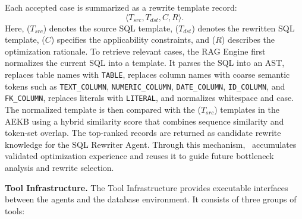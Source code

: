 % 
Each accepted case is summarized as a rewrite template record:
\[
\langle T_{\mathit{src}}, T_{\mathit{dst}}, C, R \rangle .
\]
Here, ($T_{\mathit{src}}$) denotes the source SQL template, ($T_{\mathit{dst}}$) denotes the rewritten SQL template, ($C$) specifies the applicability constraints, and ($R$) describes the optimization rationale.
%
To retrieve relevant cases, the RAG Engine first normalizes the current SQL into a template.
It parses the SQL into an AST, replaces table names with \texttt{TABLE}, replaces column names with coarse semantic tokens such as \texttt{TEXT\_COLUMN}, \texttt{NUMERIC\_COLUMN}, \texttt{DATE\_COLUMN}, \texttt{ID\_COLUMN}, and \texttt{FK\_COLUMN}, replaces literals with \texttt{LITERAL}, and normalizes whitespace and case.
The normalized template is then compared with the ($T_{\mathit{src}}$) templates in the AEKB using a hybrid similarity score that combines sequence similarity and token-set overlap.
The top-ranked records are returned as candidate rewrite knowledge for the SQL Rewriter Agent.
Through this mechanism, \toolname\ accumulates validated optimization experience and reuses it to guide future bottleneck analysis and rewrite selection.



\textbf{Tool Infrastructure.}
The Tool Infrastructure provides executable interfaces between the agents and the database environment.
It consists of three groups of tools:

